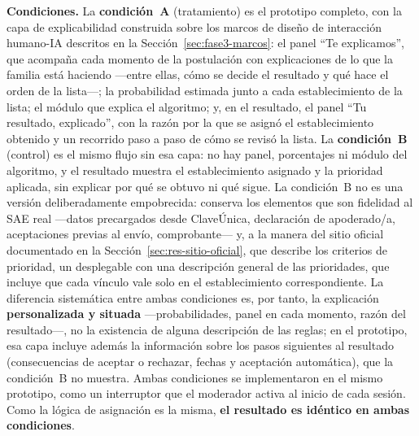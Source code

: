 \textbf{Condiciones.} La \textbf{condición~A} (tratamiento) es el prototipo completo, con la capa de explicabilidad construida sobre los marcos de diseño de interacción humano-IA descritos en la Sección~\ref{sec:fase3-marcos}: el panel ``Te explicamos'', que acompaña cada momento de la postulación con explicaciones de lo que la familia está haciendo ---entre ellas, cómo se decide el resultado y qué hace el orden de la lista---; la probabilidad estimada junto a cada establecimiento de la lista; el módulo que explica el algoritmo; y, en el resultado, el panel ``Tu resultado, explicado'', con la razón por la que se asignó el establecimiento obtenido y un recorrido paso a paso de cómo se revisó la lista. La \textbf{condición~B} (control) es el mismo flujo sin esa capa: no hay panel, porcentajes ni módulo del algoritmo, y el resultado muestra el establecimiento asignado y la prioridad aplicada, sin explicar por qué se obtuvo ni qué sigue. La condición~B no es una versión deliberadamente empobrecida: conserva los elementos que son fidelidad al SAE real ---datos precargados desde ClaveÚnica, declaración de apoderado/a, aceptaciones previas al envío, comprobante--- y, a la manera del sitio oficial documentado en la Sección~\ref{sec:res-sitio-oficial}, que describe los criterios de prioridad, un desplegable con una descripción general de las prioridades, que incluye que cada vínculo vale solo en el establecimiento correspondiente. La diferencia sistemática entre ambas condiciones es, por tanto, la explicación \textbf{personalizada y situada} ---probabilidades, panel en cada momento, razón del resultado---, no la existencia de alguna descripción de las reglas; en el prototipo, esa capa incluye además la información sobre los pasos siguientes al resultado (consecuencias de aceptar o rechazar, fechas y aceptación automática), que la condición~B no muestra. Ambas condiciones se implementaron en el mismo prototipo, como un interruptor que el moderador activa al inicio de cada sesión. Como la lógica de asignación es la misma, \textbf{el resultado es idéntico en ambas condiciones}.


